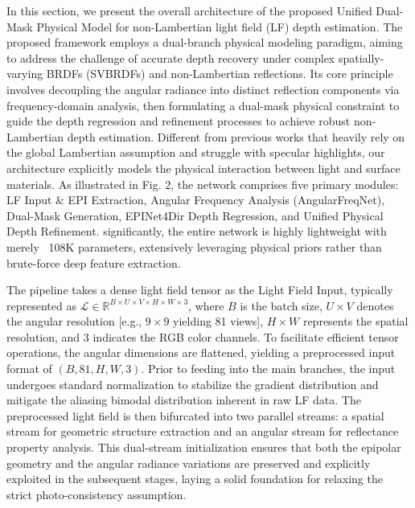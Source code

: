 \documentclass[lettersize,journal]{IEEEtran}
\begin{document}
In this section, we present the overall architecture of the proposed Unified Dual-Mask Physical Model for non-Lambertian light field (LF) depth estimation. The proposed framework employs a dual-branch physical modeling paradigm, aiming to address the challenge of accurate depth recovery under complex spatially-varying BRDFs (SVBRDFs) and non-Lambertian reflections. Its core principle involves decoupling the angular radiance into distinct reflection components via frequency-domain analysis, then formulating a dual-mask physical constraint to guide the depth regression and refinement processes to achieve robust non-Lambertian depth estimation. Different from previous works that heavily rely on the global Lambertian assumption and struggle with specular highlights, our architecture explicitly models the physical interaction between light and surface materials. As illustrated in Fig. 2, the network comprises five primary modules: LF Input \& EPI Extraction, Angular Frequency Analysis (AngularFreqNet), Dual-Mask Generation, EPINet4Dir Depth Regression, and Unified Physical Depth Refinement. significantly, the entire network is highly lightweight with merely ~108K parameters, extensively leveraging physical priors rather than brute-force deep feature extraction.

The pipeline takes a dense light field tensor as the Light Field Input, typically represented as $\mathcal{L} \in \mathbb{R}^{B \times U \times V \times H \times W \times 3}$, where $B$ is the batch size, $U \times V$ denotes the angular resolution  [e.g., $9 \times 9$ yielding 81 views], $H \times W$ represents the spatial resolution, and $3$ indicates the RGB color channels. To facilitate efficient tensor operations, the angular dimensions are flattened, yielding a preprocessed input format of $(B, 81, H, W, 3)$. Prior to feeding into the main branches, the input undergoes standard normalization to stabilize the gradient distribution and mitigate the aliasing bimodal distribution inherent in raw LF data. The preprocessed light field is then bifurcated into two parallel streams: a spatial stream for geometric structure extraction and an angular stream for reflectance property analysis. This dual-stream initialization ensures that both the epipolar geometry and the angular radiance variations are preserved and explicitly exploited in the subsequent stages, laying a solid foundation for relaxing the strict photo-consistency assumption.
\end{document}
